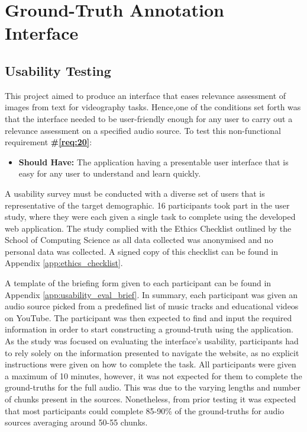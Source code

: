 \documentclass{l4proj}
\begin{document}
\section{Ground-Truth Annotation Interface}
\subsection{Usability Testing}
\label{sec:usability_testing}
This project aimed to produce an interface that eases relevance assessment of images from text for videography tasks. Hence,one of the conditions set forth was that the interface needed to be user-friendly enough for any user to carry out a relevance assessment on a specified audio source. To test this non-functional requirement \textbf{\#\ref{req:20}}:

\begin{itemize}
    \item \textbf{Should Have:} The application having a presentable user interface that is easy for any user to understand and learn quickly.
\end{itemize}

A usability survey must be conducted with a diverse set of users that is representative of the target demographic. 16 participants took part in the user study, where they were each given a single task to complete using the developed web application. The study complied with the Ethics Checklist outlined by the School of Computing Science as all data collected was anonymised and no personal data was collected. A signed copy of this checklist can be found in Appendix \ref{app:ethics_checklist}.

A template of the briefing form given to each participant can be found in Appendix \ref{app:usability_eval_brief}. In summary, each participant was given an audio source picked from a predefined list of music tracks and educational videos on YouTube. The participant was then expected to find and input the required information in order to start constructing a ground-truth using the application. As the study was focused on evaluating the interface's usability, participants had to rely solely on the information presented to navigate the website, as no explicit instructions were given on how to complete the task. All participants were given a maximum of 10 minutes, however, it was not expected for them to complete the ground-truths for the full audio. This was due to the varying lengths and number of chunks present in the sources. Nonetheless, from prior testing it was expected that most participants could complete 85-90\% of the ground-truths for audio sources averaging around 50-55 chunks.
\end{document}

